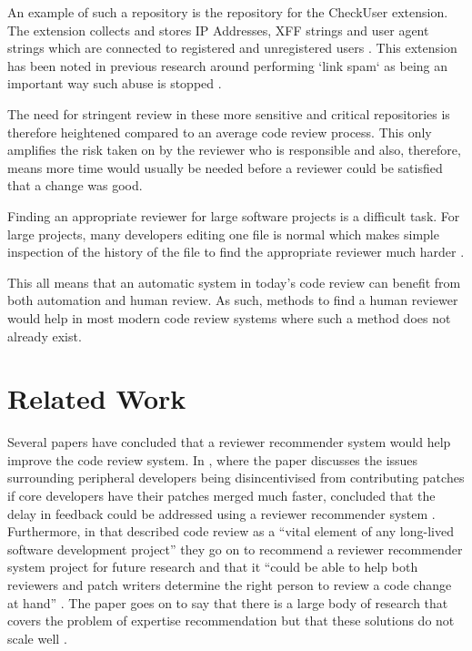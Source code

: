 An example of such a repository is the repository for the CheckUser extension. The extension collects and stores IP Addresses, XFF strings and user agent strings which are connected to registered and unregistered users \citep[p. 158]{10.1145/2030376.2030394} \citep{ExtensionCheckUser}. This extension has been noted in previous research around performing `link spam` as being an important way such abuse is stopped \citep[p. 158]{10.1145/2030376.2030394}.

The need for stringent review in these more sensitive and critical repositories is therefore heightened compared to an average code review process. This only amplifies the risk taken on by the reviewer who is responsible and also, therefore, means more time would usually be needed before a reviewer could be satisfied that a change was good.

Finding an appropriate reviewer for large software projects is a difficult task. For large projects, many developers editing one file is normal which makes simple inspection of the history of the file to find the appropriate reviewer much harder \citep[p. 931]{6606642}.

This all means that an automatic system in today's code review can benefit from both automation and human review. As such, methods to find a human reviewer would help in most modern code review systems where such a method does not already exist.

\section{Related Work\label{section:related-work}}

Several papers have concluded that a reviewer recommender system would help improve the code review system. In \cite{10.1145/2652524.2652544}, where the paper discusses the issues surrounding peripheral developers being disincentivised from contributing patches if core developers have their patches merged much faster, concluded that the delay in feedback could be addressed using a reviewer recommender system \citep[p. 9]{10.1145/2652524.2652544}. Furthermore, in \cite{10.1145/2884781.2884840} that described code review as a ``vital element of any long-lived software development project'' they go on to recommend a reviewer recommender system project for future research and that it ``could be able to help both reviewers and patch writers determine the right person to review a code change at hand'' \citep[p. 1037]{10.1145/2884781.2884840}. The paper goes on to say that there is a large body of research that covers the problem of expertise recommendation but that these solutions do not scale well \citep[p. 1037]{10.1145/2884781.2884840}.

